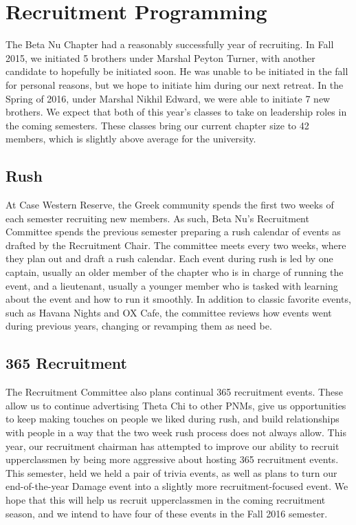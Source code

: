 \chapter{Recruitment Programming}

  The Beta Nu Chapter had a reasonably successfully year of recruiting. In Fall 2015, we initiated 5 brothers under Marshal Peyton Turner, with another candidate to hopefully be initiated soon. He was unable to be initiated in the fall for personal reasons, but we hope to initiate him during our next retreat. In the Spring of 2016, under Marshal Nikhil Edward, we were able to initiate 7 new brothers. We expect that both of this year’s classes to take on leadership roles in the coming semesters. These classes bring our current chapter size to 42 members, which is slightly above average for the university.
    
  \section*{Rush}
    At Case Western Reserve, the Greek community spends the first two weeks of each semester recruiting new members. As such, Beta Nu's Recruitment Committee spends the previous semester preparing a rush calendar of events as drafted by the Recruitment Chair. The committee meets every two weeks, where they plan out and draft a rush calendar. Each event during rush is led by one captain, usually an older member of the chapter who is in charge of running the event, and a lieutenant, usually a younger member who is tasked with learning about the event and how to run it smoothly. In addition to classic favorite events, such as Havana Nights and OX Cafe, the committee reviews how events went during previous years, changing or revamping them as need be.

  \section*{365 Recruitment}    
    The Recruitment Committee also plans continual 365 recruitment events. These allow us to continue advertising Theta Chi to other PNMs, give us opportunities to keep making touches on people we liked during rush, and build relationships with people in a way that the two week rush process does not always allow. This year, our recruitment chairman has attempted to improve our ability to recruit upperclassmen by being more aggressive about hosting 365 recruitment events. This semester, held we held a pair of trivia events, as well as plans to turn our end-of-the-year Damage event into a slightly more recruitment-focused event. We hope that this will help us recruit upperclassmen in the coming recruitment season, and we intend to have four of these events in the Fall 2016 semester.
    
